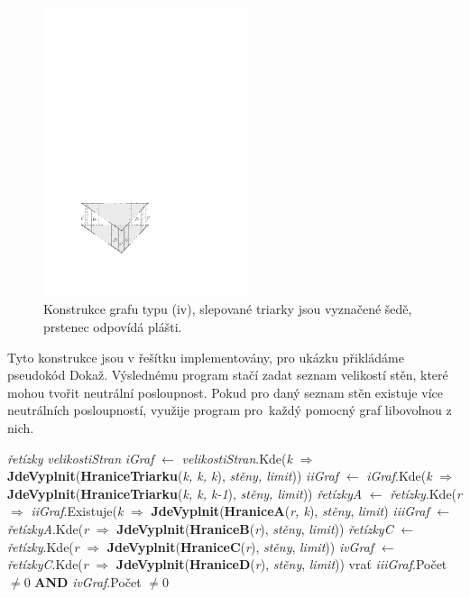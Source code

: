\begin{figure}[h]\centering
\includegraphics[width = 60mm]{../img/iv-construction}
\caption{Konstrukce grafu typu (iv), slepované triarky jsou vyznačené šedě, prstenec odpovídá plášti.}
\label{obr03:konstrukceiv}
\end{figure}

Tyto konstrukce jsou v řešítku implementovány, pro ukázku přikládáme pseudokód Dokaž. Výslednému program stačí zadat seznam velikostí stěn, které mohou tvořit neutrální posloupnost. Pokud pro daný seznam stěn existuje více neutrálních posloupností, využije program pro~každý pomocný graf libovolnou z nich.


\begin{algorithm}
\label{alg:dokaz}
\begin{algorithmic}
\State \textit{řetízky} 
\State \textit{velikostiStran} 
\State 
\State \textit{iGraf} $\gets$ \textit{velikostiStran}.Kde(\textit{k} $\Rightarrow$ \textbf{JdeVyplnit}(\textbf{HraniceTriarku}(\textit{k, k, k}), \textit{stěny, limit}))
\State \textit{iiGraf} $\gets$ \textit{iGraf}.Kde(\textit{k} $\Rightarrow$ \textbf{JdeVyplnit}(\textbf{HraniceTriarku}(\textit{k, k, k-1}), \textit{stěny, limit}))
\State \textit{řetízkyA} $\gets$ \textit{řetízky}.Kde(\textit{r} $\Rightarrow$ \textit{iiGraf}.Existuje(\textit{k} $\Rightarrow$ \textbf{JdeVyplnit}(\textbf{HraniceA}(\textit{r, k}), \textit{stěny}, \textit{limit})
\State \textit{iiiGraf} $\gets$ \textit{řetízkyA}.Kde(\textit{r} $\Rightarrow$ \textbf{JdeVyplnit}(\textbf{HraniceB}(\textit{r}), \textit{stěny}, \textit{limit}))
\State \textit{řetízkyC} $\gets$ \textit{řetízky}.Kde(\textit{r} $\Rightarrow$ \textbf{JdeVyplnit}(\textbf{HraniceC}(\textit{r}), \textit{stěny}, \textit{limit}))
\State \textit{ivGraf} $\gets$ \textit{řetízkyC}.Kde(\textit{r} $\Rightarrow$ \textbf{JdeVyplnit}(\textbf{HraniceD}(\textit{r}), \textit{stěny}, \textit{limit}))
\State 
\State vrať \textit{iiiGraf}.Počet $ \neq 0$ \textbf{AND} \textit{ivGraf}.Počet $\neq 0$

\EndProcedure

\end{algorithmic}
\end{algorithm}


